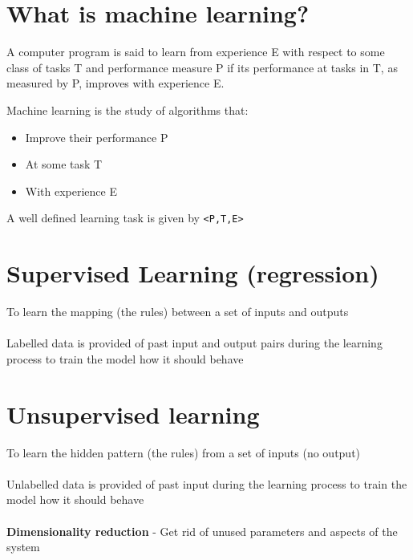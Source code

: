 \documentclass{article}[18pt]
\begin{document}
\section{What is machine learning?}
\begin{defin}
A computer program is said to learn from experience E with respect to some class of tasks T and performance measure P if its performance at tasks in T, as measured by P, improves with experience E.
\end{defin}
Machine learning is the study of algorithms that:
\begin{itemize}
	\item Improve their performance P
	\item At some task T
	\item With experience E
\end{itemize}
A well defined learning task is given by \texttt{<P,T,E>}
\section{Supervised Learning (regression)}
To learn the mapping (the rules) between a set of inputs and outputs\\
\\
Labelled data is provided of past input and output pairs during the learning process to train the model how it should behave
\section{Unsupervised learning}
To learn the hidden pattern (the rules) from a set of inputs (no output)\\
\\
Unlabelled data is provided of past input during the learning process to train the model how it should behave\\
\\
\textbf{Dimensionality reduction} - Get rid of unused parameters and aspects of the system
\end{document}
